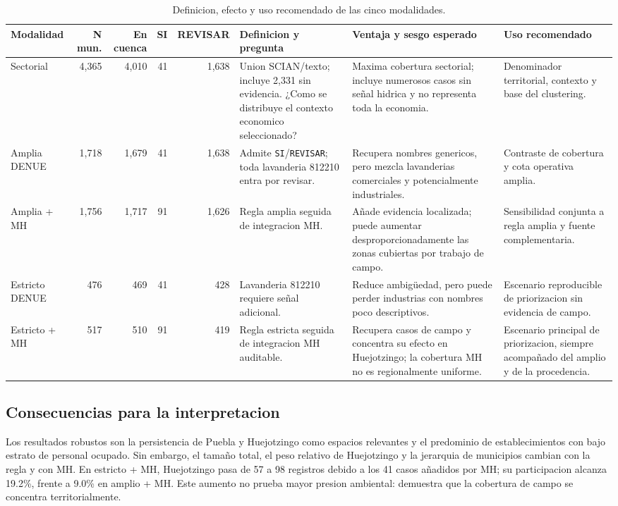 \documentclass[11pt,letterpaper]{article}
\begin{document}
\begin{landscape}
\begin{table}[H]
\centering
\small
\caption{Definicion, efecto y uso recomendado de las cinco modalidades.}
\begin{tabularx}{\linewidth}{p{2.4cm}rrrrp{4.0cm}p{4.2cm}X}
\toprule
\textbf{Modalidad} & \textbf{N mun.} & \textbf{En cuenca} & \textbf{SI} & \textbf{REVISAR} & \textbf{Definicion y pregunta} & \textbf{Ventaja y sesgo esperado} & \textbf{Uso recomendado} \\
\midrule
Sectorial & 4,365 & 4,010 & 41 & 1,638 & Union SCIAN/texto; incluye 2,331 sin evidencia. ¿Como se distribuye el contexto economico seleccionado? & Maxima cobertura sectorial; incluye numerosos casos sin señal hidrica y no representa toda la economia. & Denominador territorial, contexto y base del clustering. \\
Amplia DENUE & 1,718 & 1,679 & 41 & 1,638 & Admite \texttt{SI}/\texttt{REVISAR}; toda lavanderia 812210 entra por revisar. & Recupera nombres genericos, pero mezcla lavanderias comerciales y potencialmente industriales. & Contraste de cobertura y cota operativa amplia. \\
Amplia + MH & 1,756 & 1,717 & 91 & 1,626 & Regla amplia seguida de integracion MH. & Añade evidencia localizada; puede aumentar desproporcionadamente las zonas cubiertas por trabajo de campo. & Sensibilidad conjunta a regla amplia y fuente complementaria. \\
Estricto DENUE & 476 & 469 & 41 & 428 & Lavanderia 812210 requiere señal adicional. & Reduce ambigüedad, pero puede perder industrias con nombres poco descriptivos. & Escenario reproducible de priorizacion sin evidencia de campo. \\
Estricto + MH & 517 & 510 & 91 & 419 & Regla estricta seguida de integracion MH auditable. & Recupera casos de campo y concentra su efecto en Huejotzingo; la cobertura MH no es regionalmente uniforme. & Escenario principal de priorizacion, siempre acompañado del amplio y de la procedencia. \\
\bottomrule
\end{tabularx}
\end{table}
\end{landscape}

\subsection{Consecuencias para la interpretacion}

Los resultados robustos son la persistencia de Puebla y Huejotzingo como espacios relevantes y el predominio de establecimientos con bajo estrato de personal ocupado. Sin embargo, el tamaño total, el peso relativo de Huejotzingo y la jerarquia de municipios cambian con la regla y con MH. En estricto + MH, Huejotzingo pasa de 57 a 98 registros debido a los 41 casos añadidos por MH; su participacion alcanza 19.2\%, frente a 9.0\% en amplio + MH. Este aumento no prueba mayor presion ambiental: demuestra que la cobertura de campo se concentra territorialmente.
\end{document}

